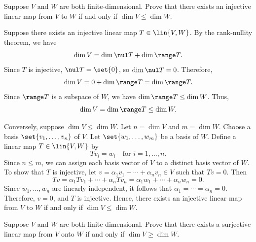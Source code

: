 \begin{exercise}[3b16]
    Suppose $V$ and $W$ are both finite-dimensional. Prove that there exists an injective linear map from $V$ to $W$ if and only if $\dim V \leq \dim W$.
\end{exercise}

\begin{sol}
    Suppose there exists an injective linear map $T \in \lin{V, W}$. By the rank-nullity theorem, we have
    \[\dim V = \dim \nul T + \dim \range T.\]
    Since $T$ is injective, $\nul T = \set{0}$, so $\dim \nul T = 0$. Therefore,
    \[\dim V = 0 + \dim \range T = \dim \range T.\]
    Since $\range T$ is a subspace of $W$, we have $\dim \range T \leq \dim W$. Thus,
    \[\dim V = \dim \range T \leq \dim W.\]

    Conversely, suppose $\dim V \leq \dim W$. Let $n = \dim V$ and $m = \dim W$. Choose a basis $\set{v_1, \ldots, v_n}$ of $V$. Let $\set{w_1, \ldots, w_m}$ be a basis of $W$. Define a linear map $T \in \lin{V, W}$ by
    \[Tv_i = w_i \quad \text{for } i = 1, \ldots, n.\]
    Since $n \leq m$, we can assign each basis vector of $V$ to a distinct basis vector of $W$. To show that $T$ is injective, let $v = \alpha_1 v_1 + \cdots + \alpha_n v_n \in V$ such that $Tv = 0$. Then
    \[Tv = \alpha_1 Tv_1 + \cdots + \alpha_n Tv_n = \alpha_1 w_1 + \cdots + \alpha_n w_n = 0.\]
    Since $w_1, \ldots, w_n$ are linearly independent, it follows that $\alpha_1 = \cdots = \alpha_n = 0$. Therefore, $v = 0$, and $T$ is injective. Hence, there exists an injective linear map from $V$ to $W$ if and only if $\dim V \leq \dim W$.
\end{sol}

\begin{exercise}[3b17]
    Suppose $V$ and $W$ are both finite-dimensional. Prove that there exists a surjective linear map from $V$ onto $W$ if and only if $\dim V \geq \dim W$.
\end{exercise}

